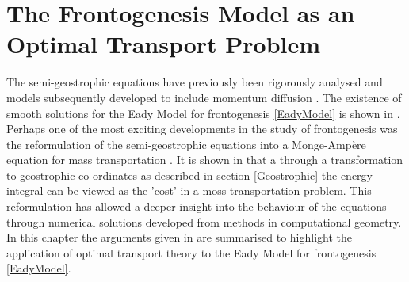 \chapter{The Frontogenesis Model as an Optimal Transport Problem \label{Chapter3}}
The semi-geostrophic equations have previously been rigorously analysed \cite{Hoskins1975,Bannon1988,Cullen1993} and models subsequently developed to include momentum diffusion \cite{Blumen1990, Nakamura1994}. The existence of smooth solutions for the Eady Model for frontogenesis \ref{EadyModel} is shown in \cite{Brenier2009}. Perhaps one of the most exciting developments in the study of frontogenesis was the reformulation of the semi-geostrophic equations into a Monge-Amp\`{e}re equation for mass transportation \cite{Benamou1998} . It is shown in \cite{Cullen2006a} that a through a transformation to geostrophic co-ordinates as described in section \ref{Geostrophic} the energy integral can be viewed as the 'cost' in a moss transportation problem. This reformulation has allowed a deeper insight into the behaviour of the equations through numerical solutions developed from methods in computational geometry. In this chapter the arguments given in \cite{Cullen2006a} are summarised to highlight the application of optimal transport theory to the Eady Model for frontogenesis \ref{EadyModel}.
